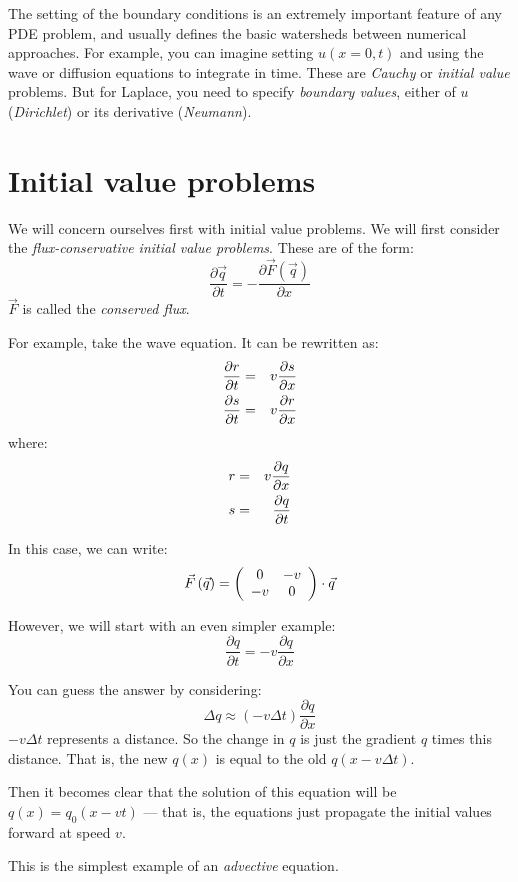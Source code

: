 The setting of the boundary conditions is an extremely important
feature of any PDE problem, and usually defines the basic watersheds
between numerical approaches. For example, you can imagine setting
$u(x=0, t)$ and using the wave or diffusion equations to integrate in
time.  These are {\it Cauchy} or {\it initial value} problems.
But for Laplace, you need to specify {\it boundary values}, either of
$u$ ({\it Dirichlet}) or its derivative ({\it Neumann}).

\section{Initial value problems}

We will concern ourselves first with initial value problems. We will
first consider the {\it flux-conservative initial value
  problems}. These are of the form:
\begin{equation}
  \frac{\partial \vec{q}}{\partial t} =
  - \frac{\partial \vec{F}\left(\vec{q}\right)}{\partial x}
\end{equation}
$\vec{F}$ is called the {\it conserved flux}.

For example, take the wave equation. It can be rewritten as:
\begin{eqnarray}
\frac{\partial r}{\partial t} &=&  v \frac{\partial s}{\partial x} \cr
\frac{\partial s}{\partial t} &=&  v \frac{\partial r}{\partial x}
\end{eqnarray}
where:
\begin{eqnarray}
r &=& v \frac{\partial q}{\partial x}\cr
s &=& \frac{\partial q}{\partial t}
\end{eqnarray}

In this case, we can write:
\begin{equation}
\vec{F}\left(\vec{q}\right) = 
\left(\begin{array}{cc}
  0 & -v \cr
  -v & 0 
\end{array}\right) \cdot \vec{q}
\end{equation}

However, we will start with an even simpler example:
\begin{equation}
\frac{\partial q}{\partial t} = - v\frac{\partial q}{\partial x}
\end{equation}


\begin{answer}
  You can guess the answer by considering:
  \begin{equation}
    {\Delta q} \approx (-v \Delta t) \frac{\partial q}{\partial x}
  \end{equation}
  $-v\Delta t$ represents a distance. So the change in $q$ is just the
  gradient $q$ times this distance. That is, the new $q(x)$ is equal
  to the old $q(x-v\Delta t)$. 

  Then it becomes clear that the solution of this equation will be
  $q(x) = q_0(x-vt)$ --- that is, the equations just propagate the
  initial values forward at speed $v$.

  This is the simplest example of an {\it advective} equation. 
\end{answer}

